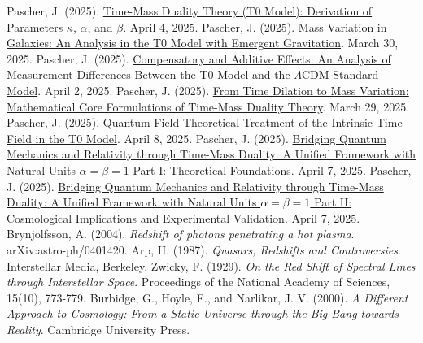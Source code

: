 \documentclass[12pt,a4paper]{article}
\begin{document}
	\begin{thebibliography}{99}
		 Pascher, J. (2025). \href{https://github.com/jpascher/T0-Time-Mass-Duality/tree/main/2/pdf/English/ZeitMasseT0ParamsEn.pdf}{Time-Mass Duality Theory (T0 Model): Derivation of Parameters $\kappa$, $\alpha$, and $\beta$}. April 4, 2025.
		 Pascher, J. (2025). \href{https://github.com/jpascher/T0-Time-Mass-Duality/tree/main/2/pdf/English/MassVarGalaxienEn.pdf}{Mass Variation in Galaxies: An Analysis in the T0 Model with Emergent Gravitation}. March 30, 2025.
		 Pascher, J. (2025). \href{https://github.com/jpascher/T0-Time-Mass-Duality/tree/main/2/pdf/English/MessdifferenzenT0StandardEn.pdf}{Compensatory and Additive Effects: An Analysis of Measurement Differences Between the T0 Model and the $\Lambda$CDM Standard Model}. April 2, 2025.
		 Pascher, J. (2025). \href{https://github.com/jpascher/T0-Time-Mass-Duality/tree/main/2/pdf/English/MathZeitMasseLagrange.pdf}{From Time Dilation to Mass Variation: Mathematical Core Formulations of Time-Mass Duality Theory}. March 29, 2025.
		 Pascher, J. (2025). \href{https://github.com/jpascher/T0-Time-Mass-Duality/tree/main/2/pdf/English/QFTIntrinsischesZeitT0En.pdf}{Quantum Field Theoretical Treatment of the Intrinsic Time Field in the T0 Model}. April 8, 2025.
		 Pascher, J. (2025). \href{https://github.com/jpascher/T0-Time-Mass-Duality/tree/main/2/pdf/English/QMRelTimeMassPart1ZEn.pdf}{Bridging Quantum Mechanics and Relativity through Time-Mass Duality: A Unified Framework with Natural Units $\alpha = \beta = 1$ Part I: Theoretical Foundations}. April 7, 2025.
		 Pascher, J. (2025). \href{https://github.com/jpascher/T0-Time-Mass-Duality/tree/main/2/pdf/English/QMRelTimeMassPart2ZEn.pdf}{Bridging Quantum Mechanics and Relativity through Time-Mass Duality: A Unified Framework with Natural Units $\alpha = \beta = 1$ Part II: Cosmological Implications and Experimental Validation}. April 7, 2025.
		 Brynjolfsson, A. (2004). \textit{Redshift of photons penetrating a hot plasma}. arXiv:astro-ph/0401420.
		 Arp, H. (1987). \textit{Quasars, Redshifts and Controversies}. Interstellar Media, Berkeley.
		 Zwicky, F. (1929). \textit{On the Red Shift of Spectral Lines through Interstellar Space}. Proceedings of the National Academy of Sciences, 15(10), 773-779.
		 Burbidge, G., Hoyle, F., and Narlikar, J. V. (2000). \textit{A Different Approach to Cosmology: From a Static Universe through the Big Bang towards Reality}. Cambridge University Press.

\end{thebibliography}
\end{document}
